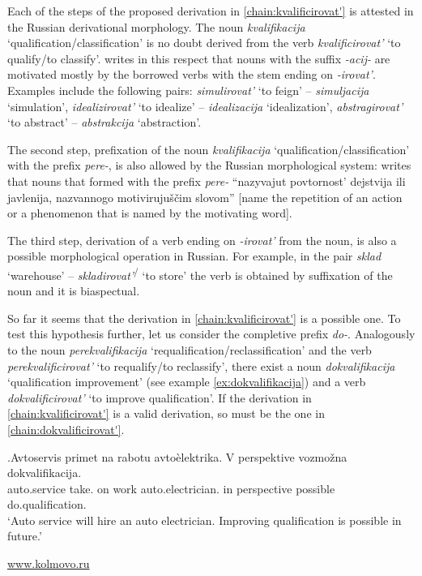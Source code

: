 Each of the steps of the proposed derivation in \ref{chain:kvalificirovat'} is attested in the Russian derivational morphology. The noun \textit{kvalifikacija} `qualification\slash classification' is no doubt derived from the verb \textit{kvalificirovat'} `to qualify/to classify'. \citet{Shvedova:82} writes in this respect that nouns with the suffix \textit{-acij-} are motivated mostly by the borrowed verbs with the stem ending on \textit{-irovat'}. Examples \citep[taken from][159]{Shvedova:82} include the following pairs: \textit{simulirovat'} `to feign' -- \textit{simuljacija} `simulation', \textit{idealizirovat'} `to idealize'  -- \textit{idealizacija} `idealization', \textit{abstragirovat'} `to abstract' -- \textit{abstrakcija} `abstraction'.

The second step, prefixation of the noun \textit{kvalifikacija} `qualification\slash classifica\-tion' with the prefix \textit{pere-}, is also allowed by the Russian morphological system: \citet[226]{Shvedova:82} writes that nouns that formed with the prefix \textit{pere-} ``nazyvajut povtornost' dejstvija ili javlenija, nazvannogo motiviruju\v{s}\v{c}im slovom'' [name the repetition of an action or a phenomenon that is named by the motivating word].

The third step, derivation of a verb ending on \textit{-irovat'} from the noun, is also a possible morphological operation in Russian. For example, in the pair \textit{sklad} `warehouse' -- \textit{skladirovat'}\textsuperscript{\PF\slash\IPF} `to store' the verb is obtained by suffixation of the noun and it is biaspectual.

So far it seems that the derivation in \ref{chain:kvalificirovat'} is a possible one. To test this hypothesis further, let us consider the completive prefix \textit{do-}. Analogously to the noun \textit{perekvalifikacija} `requalification/reclassification' and the verb \textit{perekvalificirovat'} `to requalify/to reclassify', there exist a noun \textit{dokvalifikacija} `qualification improvement' (see example \ref{ex:dokvalifikacija}) and a verb \textit{dokvalificirovat'} `to improve qualification'. If the derivation in \ref{chain:kvalificirovat'} is a valid derivation, so must be the one in \ref{chain:dokvalificirovat'}.

\exg.\label{ex:dokvalifikacija}Avtoservis primet na rabotu avto\`{e}lektrika. V perspektive vozmo\v{z}na dokvalifikacija.\\
{auto.service} take. on work {auto.electrician.} in perspective possible do.qualification.\\
\trans `Auto service will hire an auto electrician. Improving qualification is possible in future.'
\begin{flushright}
\vspace{-0.5em}
\url{www.kolmovo.ru}
\end{flushright}

